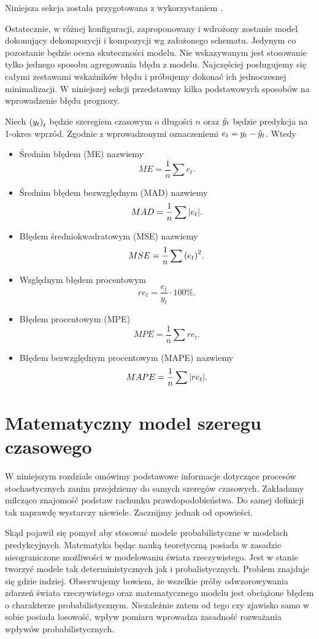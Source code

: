 \documentclass[10pt,a4paper]{book}
\begin{document}
Niniejsza sekcja została przygotowana z wykorzystaniem \citep{montgomery2015introduction}.

Ostatecznie, w różnej konfiguracji, zaproponowany i wdrożony zostanie model dokonujący dekompozycji i kompozycji wg założonego schematu. Jedynym co pozostanie będzie ocena skuteczności modelu. Nie wskazywanym jest stosowanie tylko jednego sposobu agregowania błędu z modelu. Najczęściej posługujemy się całymi zestawami wskaźników błędu i próbujemy dokonać ich jednoczesnej minimalizacji. W niniejszej sekcji przedstawmy kilka podstawowych sposobów na wprowadzenie błędu prognozy.

\begin{definition}
Niech $\left( {y_t} \right)_{t}^{} $ będzie szeregiem czasowym  o długości $n$ oraz $\predict{y}{t}$ będzie predykcja na 1-okres wprzód. Zgodnie z wprowadzonymi oznaczeniemi $e_t = y_t - \predict{y}{t}$. Wtedy
\begin{itemize}
\item Średnim błędem (ME) nazwiemy 
$$
ME = \frac{1}{n} \sum  e_t.
$$
\item Średnim błędem bezwzględnym (MAD) nazwiemy 
$$
MAD = \frac{1}{n} \sum  \abs{e_t}.
$$
\item Błędem średniokwadratowym (MSE) nazwiemy 
$$
MSE = \frac{1}{n} \sum  \bracket{e_t}^2.
$$
\item Względnym błędem procentowym 
$$
re_t = \frac{e_t}{y_t} \cdot 100 \%.
$$
\item Błędem procentowym (MPE) 
$$
MPE = \frac{1}{n} \sum  re_t.
$$
\item Błędem bezwzględnym procentowym (MAPE) nazwiemy 
$$
MAPE = \frac{1}{n} \sum  \abs{re_t} .
$$
\end{itemize}
\end{definition}

\chapter{Matematyczny model szeregu czasowego}

W niniejszym rozdziale omówimy podstawowe informacje dotyczące procesów stochastycznych zanim przejdziemy do samych szeregów czasowych. Zakładamy milcząco znajomość podstaw rachunku prawdopodobieństwa. Do samej definicji tak naprawdę wystarczy niewiele. Zacznijmy jednak od opowieści.

Skąd pojawił się pomysł aby stosować modele probabilistyczne w modelach predykcyjnych. Matematyka będąc nauką teoretyczną posiada w zasadzie nieograniczone możliwości w modelowaniu świata rzeczywistego. Jest w stanie tworzyć modele tak deterministycznych jak i probalistycznych. Problem znajduje się gdzie indziej. Obserwujemy bowiem, że wszelkie próby odwzorowywania zdarzeń świata rzeczywistego oraz matematycznego modelu jest obciążone błędem o charakterze probabilistycznym. Niezależnie zatem od tego czy zjawisko samo w sobie posiada losowość, wpływ pomiaru wprowadza zasadność rozważania wpływów probabilistycznych.
\end{document}
